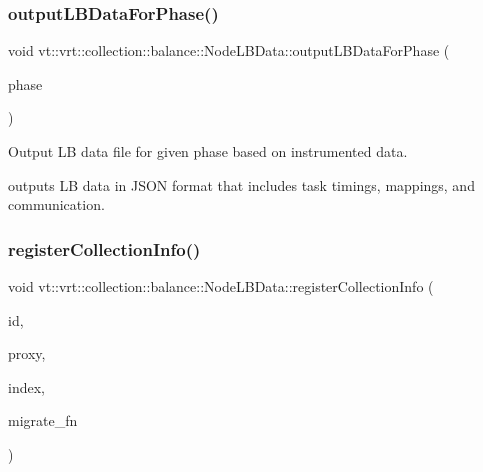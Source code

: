 \subsubsection{\texorpdfstring{output\+L\+B\+Data\+For\+Phase()}{outputLBDataForPhase()}}
{\footnotesize\ttfamily void vt\+::vrt\+::collection\+::balance\+::\+Node\+L\+B\+Data\+::output\+L\+B\+Data\+For\+Phase (\begin{DoxyParamCaption}\item[{\hyperlink{namespacevt_a46ce6733d5cdbd735d561b7b4029f6d7}{Phase\+Type}}]{phase }\end{DoxyParamCaption})}



Output LB data file for given phase based on instrumented data. 

outputs LB data in J\+S\+ON format that includes task timings, mappings, and communication. \mbox{\label{structvt_1_1vrt_1_1collection_1_1balance_1_1_node_l_b_data_a15795f61151de1c461c16308978d46a4}} 
\subsubsection{\texorpdfstring{register\+Collection\+Info()}{registerCollectionInfo()}}
{\footnotesize\ttfamily void vt\+::vrt\+::collection\+::balance\+::\+Node\+L\+B\+Data\+::register\+Collection\+Info (\begin{DoxyParamCaption}\item[{\hyperlink{namespacevt_1_1vrt_1_1collection_1_1balance_a9f5b53fafb270212279a4757d2c4cd28}{Element\+I\+D\+Struct}}]{id,  }\item[{\hyperlink{namespacevt_a1b417dd5d684f045bb58a0ede70045ac}{Virtual\+Proxy\+Type}}]{proxy,  }\item[{std\+::vector$<$ uint64\+\_\+t $>$ const \&}]{index,  }\item[{\hyperlink{structvt_1_1vrt_1_1collection_1_1balance_1_1_node_l_b_data_a200140e389d08dc8d74db16589e736bc}{Migrate\+Fn\+Type}}]{migrate\+\_\+fn }\end{DoxyParamCaption})}



